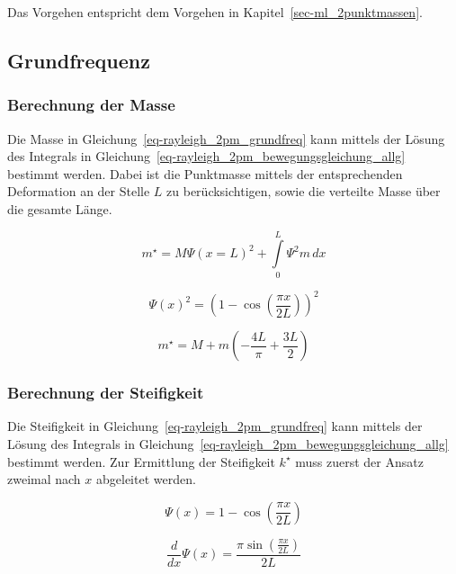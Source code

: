 \documentclass[
  letterpaper,
  DIV=11]{scrreprt}
\begin{document}
Das Vorgehen entspricht dem Vorgehen in
Kapitel~\ref{sec-ml_2punktmassen}.

\hypertarget{grundfrequenz-1}{%
\subsection{Grundfrequenz}\label{grundfrequenz-1}}

\hypertarget{berechnung-der-masse-1}{%
\subsubsection{Berechnung der Masse}\label{berechnung-der-masse-1}}

Die Masse in Gleichung~\ref{eq-rayleigh_2pm_grundfreq} kann mittels der
Lösung des Integrals in
Gleichung~\ref{eq-rayleigh_2pm_bewegungsgleichung_allg} bestimmt werden.
Dabei ist die Punktmasse mittels der entsprechenden Deformation an der
Stelle \(L\) zu berücksichtigen, sowie die verteilte Masse über die
gesamte Länge.

\begin{equation}m^{\star} = M \Psi(x=L)^{2} + \int\limits_{0}^{L} \Psi^{2} m\, dx\end{equation}

\begin{equation}\Psi(x)^{2} = \left(1 - \cos{\left(\frac{\pi x}{2 L} \right)}\right)^{2}\end{equation}

\begin{equation}m^{\star} = M + m \left(- \frac{4 L}{\pi} + \frac{3 L}{2}\right)\end{equation}

\hypertarget{berechnung-der-steifigkeit-1}{%
\subsubsection{Berechnung der
Steifigkeit}\label{berechnung-der-steifigkeit-1}}

Die Steifigkeit in Gleichung~\ref{eq-rayleigh_2pm_grundfreq} kann
mittels der Lösung des Integrals in
Gleichung~\ref{eq-rayleigh_2pm_bewegungsgleichung_allg} bestimmt werden.
Zur Ermittlung der Steifigkeit \(k^\star\) muss zuerst der Ansatz
zweimal nach \(x\) abgeleitet werden.

\begin{equation}\Psi{\left(x \right)} = 1 - \cos{\left(\frac{\pi x}{2 L} \right)}\end{equation}

\begin{equation}\frac{d}{d x} \Psi{\left(x \right)} = \frac{\pi \sin{\left(\frac{\pi x}{2 L} \right)}}{2 L}\end{equation}
\end{document}
